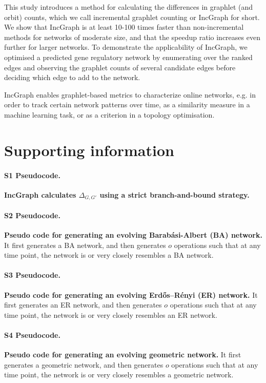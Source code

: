 This study introduces a method for calculating the differences in graphlet (and orbit) counts, which we call incremental graphlet counting or IncGraph for short. We show that IncGraph is at least 10-100 times faster than non-incremental methods for networks of moderate size, and that the speedup ratio increases even further for larger networks. 
To demonstrate the applicability of IncGraph, we optimised a predicted gene regulatory network by enumerating over the ranked edges and observing the graphlet counts of several candidate edges before deciding which edge to add to the network.

IncGraph enables graphlet-based metrics to characterize online networks, e.g. in order to track certain network patterns over time, as a similarity measure in a machine learning task, or as a criterion in a topology optimisation.


\section*{Supporting information}

\paragraph*{S1 Pseudocode.}
\label{code_incgraph}
{\bf IncGraph calculates $\Delta_{G,G'}$ using a strict branch-and-bound strategy.}

\paragraph*{S2 Pseudocode.}
\label{code_ba}
{\bf Pseudo code for generating an evolving Barab\'asi-Albert (BA) network.} It first generates a BA network, and then generates $o$ operations such that at any time point, the network is or very closely resembles a BA network.

\paragraph*{S3 Pseudocode.}
\label{code_er}
{\bf Pseudo code for generating an evolving Erd\H{o}s--R\'enyi (ER) network.} It first generates an ER network, and then generates $o$ operations such that at any time point, the network is or very closely resembles an ER network.

\paragraph*{S4 Pseudocode.}
\label{code_geo}
{\bf Pseudo code for generating an evolving geometric network.} It first generates a geometric network, and then generates $o$ operations such that at any time point, the network is or very closely resembles a geometric network.

